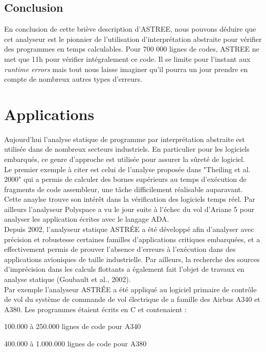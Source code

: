 \documentclass[french]{report}
\begin{document}
\subsection{Conclusion}
En conclusion de cette briève description d'ASTREE, nous pouvons déduire que cet analyseur est le pionnier de l'utilisation
d'interprétation abstraite pour vérifier des programmes en temps calculables. Pour 700 000 lignes
de codes, ASTREE ne met que 11h pour vérifier intégralement ce code.
Il se limite pour l'instant aux \textit{runtime errors} mais tout nous laisse imaginer qu'il
pourra un jour prendre en compte de nombreux autres types d'erreurs.


\section{Applications}

\paragraph{}
Aujourd'hui l'analyse statique de programme par interprétation abstraite est utilisée dans de nombreux secteurs industriels. En particulier pour les logiciels embarqués, ce genre d'approche est utilisée pour assurer la sûreté de logiciel. \\

Le premier exemple à citer est celui de l'analyse proposée dans "Theiling et al. 2000" qui a permis de calculer des bornes supérieurs au temps d'exécution de fragments de code assembleur, une tâche difficilement réalisable auparavant. Cette anaylse trouve son intérêt dans la vérification des logiciels temps réel. Par ailleurs l'analyseur Polyspace a vu le jour suite à l'échec du vol d'Ariane 5 pour analyser les application écrites avec le langage ADA. \\

Depuis 2002, l’analyseur statique ASTRÉE a été développé afin d’analyser avec précision et robustesse certaines familles d’applications critiques embarquées, et a effectivement
permis de prouver l’absence d’erreurs à l’exécution dans des applications avioniques
de taille industrielle. Par ailleurs, la recherche des sources d’imprécision dans les calculs flottants a également fait l’objet de travaux en analyse statique (Goubault et al., 2002). \\

Par exemple l'analyseur ASTRÉE a été appliqué au logiciel primaire de contrôle de vol du système de commande de vol électrique de a famille des Airbus A340 et A380. Les programmes étaient écrits en C et contenaient : \\
\begin{description}
  \item 100.000 à 250.000 lignes de code pour A340
    \item 400.000 à 1.000.000 lignes de code pour A380 \\
\end{description}
\end{document}
